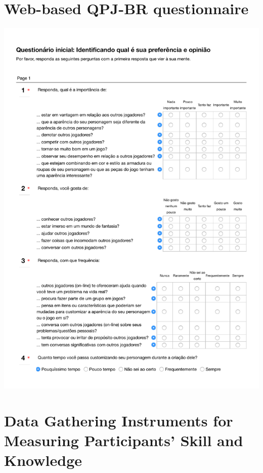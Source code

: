 
\chapter{Web-based QPJ-BR questionnaire}
\label{annex:QPJ-BR-questionnaire}
\includegraphics[page=1,width=1\textwidth]{images/annex/QPJ-BR-questionnaire.pdf}

\chapter{Data Gathering Instruments for Measuring Participants' Skill and Knowledge}
\label{annex:data-gathering-instruments-skill-knowledge}

